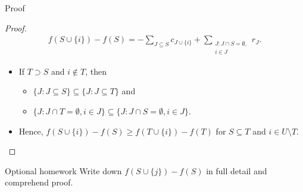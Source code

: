 \documentclass[usenames,dvipsnames]{beamer}
\begin{document}
\begin{frame}{Proof}
  \begin{proof}
    \begin{align*}
      f(S \cup \{i\}) - f(S) =
      -\sum\limits_{J \subseteq S} c_{J \cup \{i\}} + \sum\limits_{\substack{J: J \cap S = \emptyset,\\i \in J}} r_J.
    \end{align*}
    \begin{itemize}
    \item If $T \supset S$ and $i \not\in T$, then
      \begin{itemize}
      \item $\{J : J \subseteq S\} \subseteq \{J: J \subseteq T\}$ and
      \item $\{J: J \cap T = \emptyset,i\in J\} \subseteq \{J: J \cap S = \emptyset,i \in J\}$.
      \end{itemize}
      \item Hence, $f(S \cup \{i\}) - f(S) \geq f(T \cup \{i\}) -
        f(T)$ for $S \subseteq T$ and $i \in U \setminus T$.
    \end{itemize}
  \end{proof}
\end{frame}

\begin{frame}{Optional homework}
  Write down $f(S \cup \{j\}) - f(S)$ in full detail and comprehend
  proof.
\end{frame}
\end{document}
